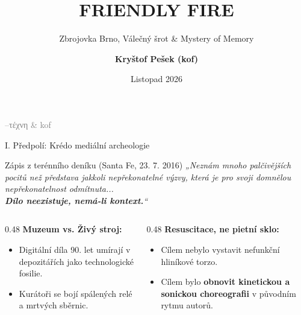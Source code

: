 \documentclass[aspectratio=169,11pt]{beamer}
\title{\textbf{FRIENDLY FIRE}}
\subtitle{Zbrojovka Brno, Válečný šrot \& Mystery of Memory}
\author{\textbf{Kryštof Pešek (kof)}}
\institute{Santa Fe (léto 2016) $\rightarrow$ Špilberk Brno (podzim 2016)}
\date{Listopad 2026}
\begin{document}
\begin{frame}
  \titlepage
  \begin{center}
    \small\textcolor{gray}{--τέχνη \& kof}
  \end{center}
\end{frame}

\begin{frame}{I. Předpolí: Krédo mediální archeologie}
  \begin{block}{Zápis z terénního deníku (Santa Fe, 23. 7. 2016)}
    \textit{„Neznám mnoho palčivějších pocitů než představa jakkoli nepřekonatelné výzvy, která je pro svoji domnělou nepřekonatelnost odmítnuta...\\
    \textbf{Dílo neexistuje, nemá-li kontext.}“}
  \end{block}
  \vspace{0.4cm}
  \begin{columns}
    \begin{column}{0.48\textwidth}
      \textbf{Muzeum vs. Živý stroj:}
      \begin{itemize}
        \item Digitální díla 90. let umírají v depozitářích jako technologické fosilie.
        \item Kurátoři se bojí spálených relé a mrtvých sběrnic.
      \end{itemize}
    \end{column}
    \begin{column}{0.48\textwidth}
      \textbf{Resuscitace, ne pietní sklo:}
      \begin{itemize}
        \item Cílem nebylo vystavit nefunkční hliníkové torzo.
        \item Cílem bylo \textbf{obnovit kinetickou a sonickou choreografii} v původním rytmu autorů.
      \end{itemize}
    \end{column}
  \end{columns}
\end{frame}
\end{document}
